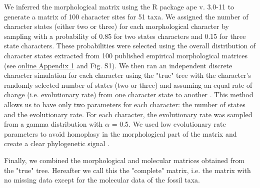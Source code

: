 \documentclass[12pt,letterpaper]{article}
\begin{document}
We inferred the morphological matrix using the R package ape v. 3.0-11 \citep{paradisape:2004} to generate a matrix of 100 character sites for 51 taxa. We assigned the number of character states (either two or three) for each morphological character by sampling with a probability of 0.85 for two states characters and 0.15 for three state characters. These probabilities were selected using the overall distribution of character states extracted from 100 published empirical morphological matrices (see \hyperref[SupplementaryMaterial]{online Appendix 1} and Fig. S1). We then ran an independent discrete character simulation for each character using the "true" tree with the character's randomly selected number of states (two or three) and assuming an equal rate of change (i.e. evolutionary rate) from one character state to another \citep{Pagel22011994}. This method allows us to have only two parameters for each character: the number of states and the evolutionary rate. For each character, the evolutionary rate was sampled from a gamma distribution with $\alpha$ = 0.5. We used low evolutionary rate parameters to avoid homoplasy in the morphological part of the matrix and create a clear phylogenetic signal \citep{wagner2000,davalosintegrating2014,wrightbayesian2014}.

Finally, we combined the morphological and molecular matrices obtained from the "true" tree. Hereafter we call this the "complete" matrix, i.e. the matrix with no missing data except for the molecular data of the fossil taxa.

\end{document}
